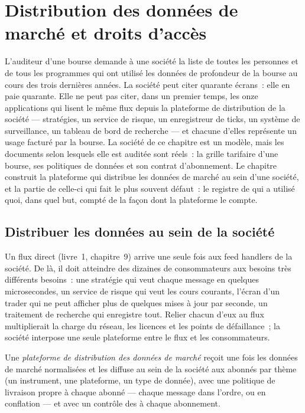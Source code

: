 \chapter{Distribution des données de marché et droits d'accès}\label{ch:pl:market-data-distribution-and-entitlements}

L'auditeur d'une bourse demande à une société la liste de toutes les personnes et de tous les programmes qui ont utilisé les données de profondeur de la bourse au cours des trois dernières années.
La société peut citer quarante écrans~: elle en paie quarante. Elle ne peut pas citer, dans un premier temps, les onze applications qui lisent le même flux depuis la
plateforme de distribution de la société --- stratégies, un service de risque, un enregistreur de ticks, un système de surveillance, un tableau de bord de recherche --- et chacune d'elles représente
un usage facturé par la bourse. La société de ce chapitre est un modèle, mais les documents selon lesquels elle est auditée sont réels~: la grille tarifaire
d'une bourse, ses politiques de données et son contrat d'abonnement. Le chapitre construit la plateforme qui distribue les données de marché au sein d'une société, et la partie de celle-ci
qui fait le plus souvent défaut~: le registre de qui a utilisé quoi, dans quel but, compté de la façon dont la plateforme le compte.

\section{Distribuer les données au sein de la société}

Un flux direct (livre~1, chapitre~9) arrive une seule fois aux feed handlers de la société. De là, il doit atteindre des dizaines de consommateurs aux besoins très différents
besoins~: une stratégie qui veut chaque message en quelques microsecondes, un service de risque qui veut les cours courants, l'écran d'un trader qui ne peut afficher
plus de quelques mises à jour par seconde, un traitement de recherche qui enregistre tout. Relier chacun d'eux au flux multiplierait
la charge du réseau, les licences et les points de défaillance~; la société interpose une seule plateforme entre le flux et les consommateurs.

\begin{definition}\label{def:pl:market-data-distribution-and-entitlements:platform}
Une \emph{plateforme de distribution des données de marché} reçoit une fois les données de marché normalisées et les diffuse
au sein de la société aux abonnés par thème (un instrument, une plateforme, un type de donnée), avec une politique de livraison propre à chaque abonné --- chaque message dans
l'ordre, ou en conflation --- et avec un contrôle des  à chaque abonnement.
\end{definition}

